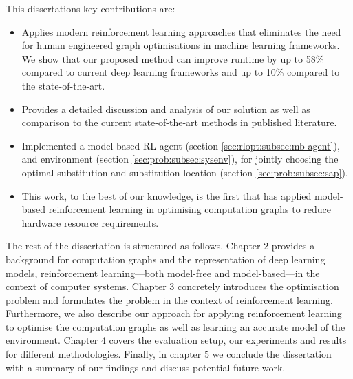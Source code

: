 This dissertations key contributions are:

\begin{itemize}
  \item Applies modern reinforcement learning approaches that eliminates the need for human engineered graph optimisations in machine learning frameworks. We show that our proposed method can improve runtime by up to 58\% compared to current deep learning frameworks and up to 10\% compared to the state-of-the-art.
  \item Provides a detailed discussion and analysis of our solution as well as comparison to the current state-of-the-art methods in published literature.
  \item Implemented a model-based RL agent (section \ref{sec:rlopt:subsec:mb-agent}), and environment (section \ref{sec:prob:subsec:sysenv}), for jointly choosing the optimal substitution and substitution location (section \ref{sec:prob:subsec:sap}).
  \item This work, to the best of our knowledge, is the first that has applied model-based reinforcement learning in optimising computation graphs to reduce hardware resource requirements.
\end{itemize}

The rest of the dissertation is structured as follows. Chapter 2 provides a background for computation graphs and the representation of deep learning models, reinforcement learning---both model-free and model-based---in the context of computer systems. Chapter 3 concretely introduces the optimisation problem and formulates the problem in the context of reinforcement learning. Furthermore, we also describe our approach for applying reinforcement learning to optimise the computation graphs as well as learning an accurate model of the environment. Chapter 4 covers the evaluation setup, our experiments and results for different methodologies. Finally, in chapter 5 we conclude the dissertation with a summary of our findings and discuss potential future work.